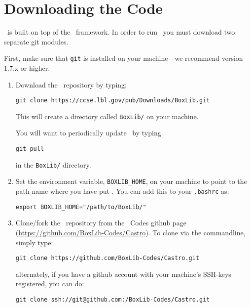 
\section{Downloading the Code}

\castro\ is built on top of the \boxlib\ framework.  In order to run
\castro\, you must download two separate git modules.

\vspace{.1in}

\noindent First, make sure that {\tt git} is installed on your machine---we recommend version 1.7.x or higher.

\vspace{.1in}

\begin{enumerate}

\item Download the \boxlib\ repository by typing: 
\begin{verbatim}
git clone https://ccse.lbl.gov/pub/Downloads/BoxLib.git
\end{verbatim}

This will create a directory called {\tt BoxLib/} on your machine.

You will want to periodically update \boxlib\ by typing
\begin{verbatim}
git pull
\end{verbatim}
in the {\tt BoxLib/} directory.  

\item Set the environment variable, {\tt BOXLIB\_HOME}, on your
  machine to point to the path name where you have put \boxlib.
  You can add this to your {\tt .bashrc} as:
\begin{verbatim}
export BOXLIB_HOME="/path/to/BoxLib/"
\end{verbatim}

\item Clone/fork the \castro\ repository from the \boxlib\ Codes {\sf
  github} page (\url{https://github.com/BoxLib-Codes/Castro}).  To
  clone via the commandline, simply type:
\begin{verbatim}
git clone https://github.com/BoxLib-Codes/Castro.git
\end{verbatim}
alternately, if you have a {\sf github} account with your
machine's SSH-keys registered, you can do:
\begin{verbatim}
git clone ssh://git@github.com:/BoxLib-Codes/Castro.git
\end{verbatim}

\end{enumerate}

